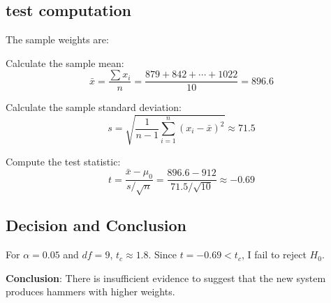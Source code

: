 \subsection*{test computation}
The sample weights are:
\begin{equation}
[879, 842, 954, 842, 885, 918, 989, 768, 867, 1022]
\end{equation}

Calculate the sample mean:
\begin{equation}
\bar{x} = \frac{\sum x_i}{n} = \frac{879 + 842 + \cdots + 1022}{10} = 896.6
\end{equation}

Calculate the sample standard deviation:
\begin{equation}
s = \sqrt{\frac{1}{n-1} \sum_{i=1}^n (x_i - \bar{x})^2} \approx 71.5
\end{equation}

Compute the test statistic:
\begin{equation}
t = \frac{\bar{x} - \mu_0}{s / \sqrt{n}} = \frac{896.6 - 912}{71.5 / \sqrt{10}} \approx -0.69
\end{equation}

\subsection*{Decision and Conclusion}
For $\alpha = 0.05$ and $df = 9$, $t_{c} \approx 1.8$. Since $t = -0.69 < t_{c}$, I fail to reject $H_{0}$.

\textbf{Conclusion}: There is insufficient evidence to suggest that the new system produces hammers with higher weights.
